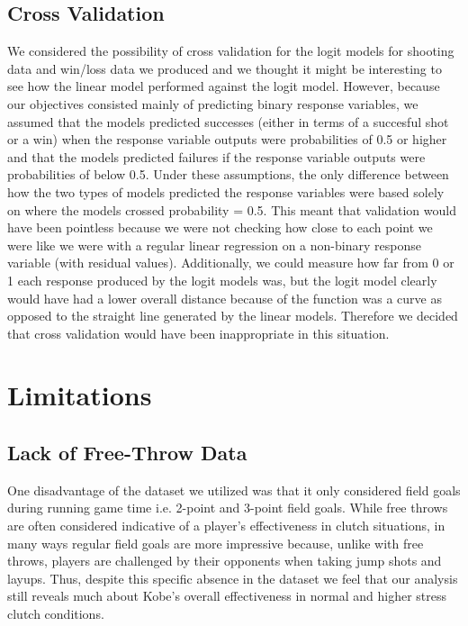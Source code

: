 \documentclass[paper=a4, fontsize=11pt]{scrartcl} %
\numberwithin{equation}{section} %
\numberwithin{figure}{section} %
\numberwithin{table}{section} %
\begin{document}
\subsection{Cross Validation}
\hspace*{1cm}We considered the possibility of cross validation for the logit models for shooting data and win/loss data we produced and we thought it might be interesting to see how the linear model performed against the logit model. However, because our objectives consisted mainly of predicting binary response variables, we assumed that the models predicted successes (either in terms of a succesful shot or a win) when the response variable outputs were probabilities of 0.5 or higher and that the models predicted failures if the response variable outputs were probabilities of below 0.5. Under these assumptions, the only difference between how the two types of models predicted the response variables were based solely on where the models crossed probability = 0.5. This meant that validation would have been pointless because we were not checking how close to each point we were like we were with a regular linear regression on a non-binary response variable (with residual values). Additionally, we could measure how far from 0 or 1 each response produced by the logit models was, but the logit model clearly would have had a lower overall distance because of the function was a curve as opposed to the straight line generated by the linear models. Therefore we decided that cross validation would have been inappropriate in this situation.

\section{Limitations}
\subsection{Lack of Free-Throw Data}
\hspace*{1cm}One disadvantage of the dataset we utilized was that it only considered field goals during running game time i.e. 2-point and 3-point field goals. While free throws are often considered indicative of a player's effectiveness in clutch situations, in many ways regular field goals are more impressive because, unlike with free throws, players are challenged by their opponents when taking jump shots and layups. Thus, despite this specific absence in the dataset we feel that our analysis still reveals much about Kobe's overall effectiveness in normal and higher stress clutch conditions.
\end{document}
